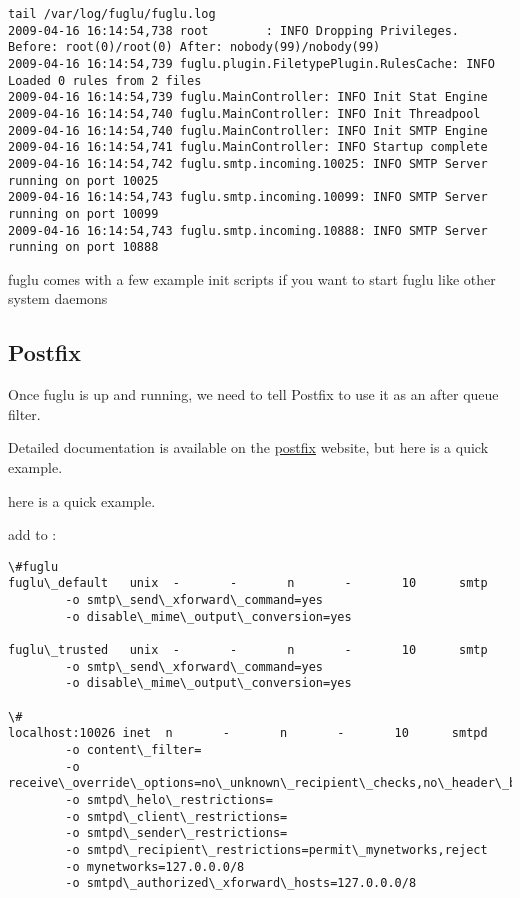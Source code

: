 \documentclass[letterpaper,10pt,english]{sphinxmanual}
\begin{document}
\begin{Verbatim}[commandchars=\\\{\}]
tail /var/log/fuglu/fuglu.log
2009-04-16 16:14:54,738 root        : INFO Dropping Privileges. Before: root(0)/root(0) After: nobody(99)/nobody(99)
2009-04-16 16:14:54,739 fuglu.plugin.FiletypePlugin.RulesCache: INFO Loaded 0 rules from 2 files
2009-04-16 16:14:54,739 fuglu.MainController: INFO Init Stat Engine
2009-04-16 16:14:54,740 fuglu.MainController: INFO Init Threadpool
2009-04-16 16:14:54,740 fuglu.MainController: INFO Init SMTP Engine
2009-04-16 16:14:54,741 fuglu.MainController: INFO Startup complete
2009-04-16 16:14:54,742 fuglu.smtp.incoming.10025: INFO SMTP Server running on port 10025
2009-04-16 16:14:54,743 fuglu.smtp.incoming.10099: INFO SMTP Server running on port 10099
2009-04-16 16:14:54,743 fuglu.smtp.incoming.10888: INFO SMTP Server running on port 10888
\end{Verbatim}

fuglu comes with a few example init scripts if you want to start fuglu like other system daemons


\subsection{Postfix}
\label{configuration-index:postfix}
Once fuglu is up and running, we need to tell Postfix to use it as an after queue filter.

Detailed documentation is available on the \href{http://www.postfix.org/FILTER\_README.html}{postfix} website, but here is a quick example.

here is a quick example.

add to  :

\begin{Verbatim}[commandchars=\\\{\}]
\#fuglu
fuglu\_default   unix  -       -       n       -       10      smtp
        -o smtp\_send\_xforward\_command=yes
        -o disable\_mime\_output\_conversion=yes

fuglu\_trusted   unix  -       -       n       -       10      smtp
        -o smtp\_send\_xforward\_command=yes
        -o disable\_mime\_output\_conversion=yes

\#
localhost:10026 inet  n       -       n       -       10      smtpd
        -o content\_filter=
        -o receive\_override\_options=no\_unknown\_recipient\_checks,no\_header\_body\_checks,no\_milters,no\_address\_mappings
        -o smtpd\_helo\_restrictions=
        -o smtpd\_client\_restrictions=
        -o smtpd\_sender\_restrictions=
        -o smtpd\_recipient\_restrictions=permit\_mynetworks,reject
        -o mynetworks=127.0.0.0/8
        -o smtpd\_authorized\_xforward\_hosts=127.0.0.0/8
\end{Verbatim}
\end{document}

